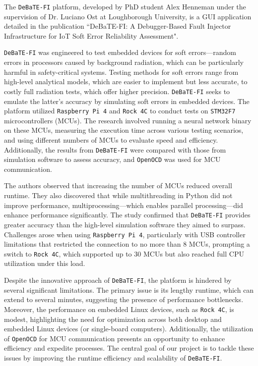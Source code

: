 The \texttt{DeBaTE-FI} platform, developed by PhD student Alex Henneman under the supervision of Dr. Luciano Ost at Loughborough University, is a GUI application detailed in the publication ``DeBaTE-FI: A Debugger-Based Fault Injector Infrastructure for IoT Soft Error Reliability Assessment"\cite{debate_fi_publication}.

\texttt{DeBaTE-FI} was engineered to test embedded devices for soft errors—random errors in processors caused by background radiation, which can be particularly harmful in safety-critical systems. Testing methods for soft errors range from high-level analytical models, which are easier to implement but less accurate, to costly full radiation tests, which offer higher precision. \texttt{DeBaTE-FI} seeks to emulate the latter's accuracy by simulating soft errors in embedded devices. The platform utilized \texttt{Raspberry Pi 4} and \texttt{Rock 4C} to conduct tests on \texttt{STM32F7} microcontrollers (MCUs). The research involved running a neural network binary on these MCUs, measuring the execution time across various testing scenarios, and using different numbers of MCUs to evaluate speed and efficiency. Additionally, the results from \texttt{DeBaTE-FI} were compared with those from simulation software to assess accuracy, and \texttt{OpenOCD} was used for MCU communication.

The authors observed that increasing the number of MCUs reduced overall runtime. They also discovered that while multithreading in Python did not improve performance, multiprocessing—which enables parallel processing—did enhance performance significantly. The study confirmed that \texttt{DeBaTE-FI} provides greater accuracy than the high-level simulation software they aimed to surpass. Challenges arose when using \texttt{Raspberry Pi 4}, particularly with USB controller limitations that restricted the connection to no more than 8 MCUs, prompting a switch to \texttt{Rock 4C}, which supported up to 30 MCUs but also reached full CPU utilization under this load.

Despite the innovative approach of \texttt{DeBaTE-FI}, the platform is hindered by several significant limitations. The primary issue is its lengthy runtime, which can extend to several minutes, suggesting the presence of performance bottlenecks. Moreover, the performance on embedded Linux devices, such as \texttt{Rock 4C}, is modest, highlighting the need for optimization across both desktop and embedded Linux devices (or single-board computers). Additionally, the utilization of \texttt{OpenOCD} for MCU communication presents an opportunity to enhance efficiency and expedite processes. The central goal of our project is to tackle these issues by improving the runtime efficiency and scalability of \texttt{DeBaTE-FI}.

